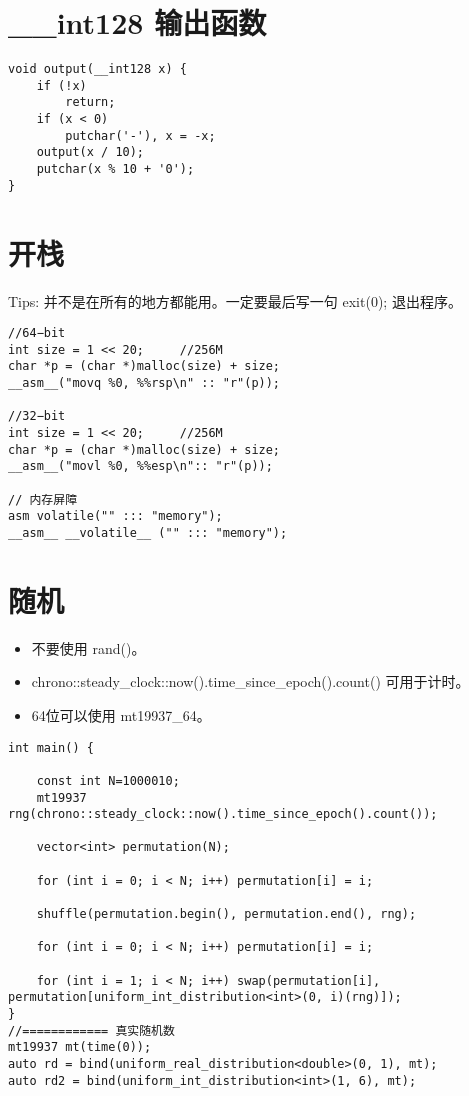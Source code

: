 \section{\_\_int128 输出函数}
\begin{verbatim}
void output(__int128 x) {
    if (!x)
        return;
    if (x < 0)
        putchar('-'), x = -x;
    output(x / 10);
    putchar(x % 10 + '0');
}
\end{verbatim}

\section{开栈}
\par \noindent Tips: 并不是在所有的地方都能用。一定要最后写一句 exit(0); 退出程序。
\begin{verbatim}
//64−bit
int size = 1 << 20;     //256M
char *p = (char *)malloc(size) + size;
__asm__("movq %0, %%rsp\n" :: "r"(p));

//32−bit
int size = 1 << 20;     //256M
char *p = (char *)malloc(size) + size;
__asm__("movl %0, %%esp\n":: "r"(p));

// 内存屏障
asm volatile("" ::: "memory");
__asm__ __volatile__ ("" ::: "memory");
\end{verbatim}
\section{随机}
\begin{itemize}
\item 不要使⽤ rand()。

\item chrono::steady\_clock::now().time\_since\_epoch().count() 可⽤于计时。

\item 64位可以使⽤ mt19937\_64。
\end{itemize}
\begin{verbatim}
int main() {
    
    const int N=1000010;
    mt19937 rng(chrono::steady_clock::now().time_since_epoch().count());
    
    vector<int> permutation(N);
    
    for (int i = 0; i < N; i++) permutation[i] = i;
    
    shuffle(permutation.begin(), permutation.end(), rng);
    
    for (int i = 0; i < N; i++) permutation[i] = i;
    
    for (int i = 1; i < N; i++) swap(permutation[i], permutation[uniform_int_distribution<int>(0, i)(rng)]);
}
//============ 真实随机数
mt19937 mt(time(0));
auto rd = bind(uniform_real_distribution<double>(0, 1), mt);
auto rd2 = bind(uniform_int_distribution<int>(1, 6), mt);
\end{verbatim}